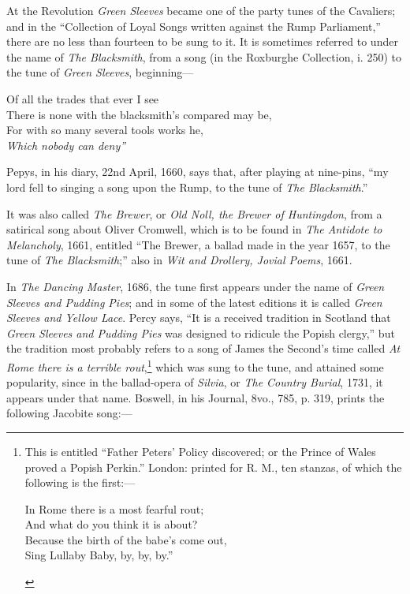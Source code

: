 At the Revolution \textit{Green Sleeves} became one of the party tunes of the Cavaliers;
and in the “Collection of Loyal Songs written against the Rump Parliament,”
there are no less than fourteen to be sung to it. It is sometimes referred to under
the name of \textit{The Blacksmith}, from a song (in the Roxburghe Collection, i. 250)
to the tune of \textit{Green Sleeves}, beginning—

\begin{scverse}Of all the trades that ever I see\\
There is none with the blacksmith’s compared may be,\\
For with so many several tools works he,\\
\vin \textit{Which nobody can deny”}
\end{scverse}

Pepys, in his diary, 22nd April, 1660, says that, after playing at nine-pins,
“my lord fell to singing a song upon the Rump, to the tune of \textit{The Blacksmith}.”

It was also called \textit{The Brewer}, or \textit{Old Noll, the Brewer of Huntingdon}, from a
satirical song about Oliver Cromwell, which is to be found in \textit{The Antidote to
Melancholy}, 1661, entitled “The Brewer, a ballad made in the year 1657, to the
tune of \textit{The Blacksmith};” also in \textit{Wit and Drollery, Jovial Poems}, 1661.

In \textit{The Dancing Master}, 1686, the tune first appears under the name of \textit{Green
Sleeves and Pudding Pies}; and in some of the latest editions it is called \textit{Green
Sleeves and Yellow Lace}. Percy says, “It is a received tradition in Scotland that
\textit{Green Sleeves and Pudding Pies} was designed to ridicule the Popish clergy,” but
the tradition most probably refers to a song of James the Second’s time called
\textit{At Rome there is a terrible rout},\footnote{\textit{}
This is entitled “Father Peters’ Policy discovered; or
the Prince of Wales proved a Popish Perkin.” London:
printed for R. M., ten stanzas, of which the following is
the first:—
\medskip
\settowidth{\versewidth}{Because the birth of the babe’s come out,}
\begin{fnverse}
\begin{patverse}
In Rome there is a most fearful rout;\\
And what do you think it is about?\\
Because the birth of the babe’s come out,\\
Sing Lullaby Baby, by, by, by.”
\end{patverse}
\end{fnverse}}
 which was sung to the tune, and attained some
popularity, since in the ballad-opera of \textit{Silvia}, or \textit{The Country Burial}, 1731,
it appears under that name. Boswell, in his Journal, 8vo., 785, p. 319, prints
the following Jacobite song:—
\origpage{}%

